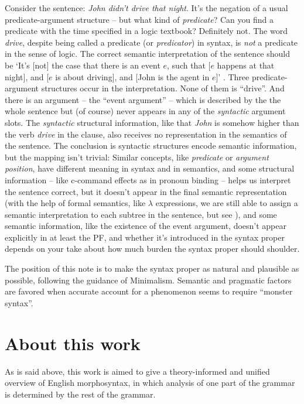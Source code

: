 \documentclass[UTF8, a4paper, oneside, scheme=plain]{ctexrep}
\newcommand*{\term}[1]{\emph{#1}}
\newcommand{\corpus}[1]{\emph{#1}}
\newcommand{\translate}[1]{`#1'}
\begin{document}
Consider the sentence: \corpus{John didn't drive that night}. 
It's the negation of a usual predicate-argument structure
-- but what kind of \term{predicate}?
Can you find a predicate with the time specified in a logic textbook?
Definitely not. 
The word \corpus{drive}, despite being called a predicate (or \term{predicator}) in syntax,
is \emph{not} a predicate in the sense of logic.
The correct semantic interpretation of the sentence should be 
\translate{It's [not] the case that there is an event $e$, such that
[$e$ happens at that night], and [$e$ is about driving], 
and [John is the agent in $e$]} \citep{zeijlstra2013}.
Three predicate-argument structures occur in the interpretation.
None of them is ``drive''.
And there is an argument -- the ``event argument'' --
which is described by the the whole sentence but (of course) 
never appears in any of the \emph{syntactic} argument slots.
The \emph{syntactic} structural information,
like that \corpus{John} is somehow higher than the verb \corpus{drive} in the clause,
also receives no representation in the semantics of the sentence.
The conclusion is syntactic structures encode semantic information,
but the mapping isn't trivial:
Similar concepts, like \term{predicate} or \term{argument position},
have different meaning in syntax and in semantics, and 
some structural information -- like c-command effects as in pronoun binding --
helps us interpret the sentence correct,
but it doesn't appear in the final semantic representation 
(with the help of formal semantics, like $\lambda$ expressions,
we are still able to assign a semantic interpretation to each subtree in the sentence,
but see ),
and some semantic information, like the existence of the event argument,
doesn't appear explicitly in at least the PF, 
and whether it's introduced in the syntax proper depends on 
your take about how much burden the syntax proper should shoulder.

The position of this note is to make the syntax proper as natural and plausible as possible,
following the guidance of Minimalism.
Semantic and pragmatic factors are favored 
when accurate account for a phenomenon seems to 
require ``monster syntax''.

\section{About this work}

As is said above,
this work is aimed to give a theory-informed and unified overview of English morphosyntax,
in which analysis of one part of the grammar is determined by the rest of the grammar.
\end{document}
